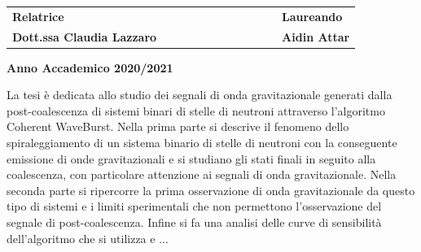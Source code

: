 \begin{titlepage}
	\vspace{20mm} %
	
	\begin{spacing}{2}
		\begin{tabular}{ l  c  c c c  cc c c c c  l }
			{\Large{\bf Relatrice}} &&&&&&&&&&& {\Large{\bf Laureando}}\\
			{\Large{\bf Dott.ssa Claudia Lazzaro}} &&&&&&&&&&& {\Large{\bf Aidin Attar}}\\
		\end{tabular}
	\end{spacing}
	\vspace{15 mm} %
	
	\begin{center}
		{\Large{\bf Anno Accademico 2020/2021}}
	\end{center}
\end{titlepage}
\clearpage{\pagestyle{empty}\cleardoublepage}

\tableofcontents
\newpage
\thispagestyle{plain}
\begin{Abstract}
	\begin{changemargin}{1cm}{1cm}
		La tesi è dedicata allo studio dei segnali di onda gravitazionale generati dalla post-coalescenza di sistemi binari di stelle di neutroni attraverso l'algoritmo Coherent WaveBurst.
		Nella prima parte si descrive il fenomeno dello spiraleggiamento di un sistema binario di stelle di neutroni con la conseguente emissione di onde gravitazionali e si studiano gli stati finali in seguito alla coalescenza, con particolare attenzione ai segnali di onda gravitazionale. Nella seconda parte si ripercorre la prima osservazione di onda gravitazionale da questo tipo di sistemi e i limiti sperimentali che non permettono l'osservazione del segnale di post-coalescenza. Infine si fa una analisi delle curve di sensibilità dell'algoritmo che si utilizza e ...
	\end{changemargin}
\end{Abstract}
